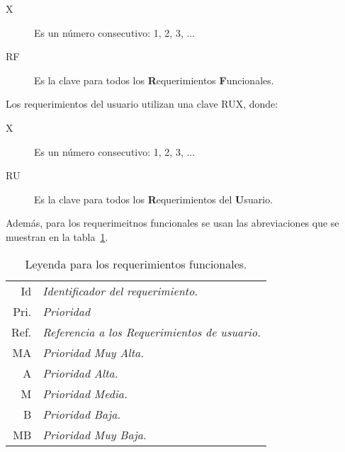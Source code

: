 \begin{description}
	\item[X] Es un número consecutivo: 1, 2, 3, ...
	\item[RF] Es la clave para todos los {\bf R}equerimientos {\bf F}uncionales.
\end{description}

	Los requerimientos del usuario utilizan una clave RUX, donde:
	
\begin{description}
	\item[X] Es un número consecutivo: 1, 2, 3, ...
	\item[RU] Es la clave para todos los {\bf R}equerimientos del {\bf U}suario.
\end{description}

	Además, para los requerimeitnos funcionales se usan las abreviaciones que se muestran en la tabla~\ref{tbl:leyendaRF}.
\begin{table}[hbtp!]
	\begin{center}
    \begin{tabular}{|r l|}
	    \hline
    	{\footnotesize Id} & {\footnotesize\em Identificador del requerimiento.}\\
    	{\footnotesize Pri.} & {\footnotesize\em Prioridad}\\
    	{\footnotesize Ref.} & {\footnotesize\em Referencia a los Requerimientos de usuario.}\\
    	{\footnotesize MA} & {\footnotesize\em Prioridad Muy Alta.}\\
    	{\footnotesize A} & {\footnotesize\em Prioridad Alta.}\\
    	{\footnotesize M} & {\footnotesize\em Prioridad Media.}\\
    	{\footnotesize B} & {\footnotesize\em Prioridad Baja.}\\
    	{\footnotesize MB} & {\footnotesize\em Prioridad Muy Baja.}\\
		\hline
    \end{tabular} 
    \caption{Leyenda para los requerimientos funcionales.}
    \label{tbl:leyendaRF}
	\end{center}
\end{table}